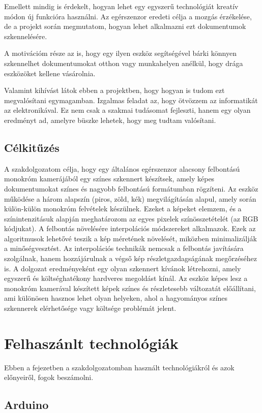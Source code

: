 \documentclass[]{thesis-ekf}
\theoremstyle{definition}
\theoremstyle{remark}
\begin{document}
Emellett mindig is érdekelt, hogyan lehet egy egyszerű technológiát kreatív módon új funkcióra használni. Az egérszenzor eredeti célja a mozgás érzékelése, de a projekt során megmutatom, hogyan lehet alkalmazni ezt dokumentumok szkennelésére.

A motivációm része az is, hogy egy ilyen eszköz segítségével bárki könnyen szkennelhet dokumentumokat otthon vagy munkahelyen anélkül, hogy drága eszközöket kellene vásárolnia. 

Valamint kihívást látok ebben a projektben, hogy hogyan is tudom ezt megvalósítani egymagamban. Izgalmas feladat az, hogy ötvözzem az informatikát az elektronikával. Ez nem csak a szakmai tudásomat fejleszti, hanem egy olyan eredményt ad, amelyre büszke lehetek, hogy meg tudtam valósítani.
\section{Célkitűzés}
A szakdolgozatom célja, hogy egy általános egérszenzor alacsony felbontású monokróm kamerájából egy színes szkennert készítsek, amely képes dokumentumokat színes és nagyobb felbontású formátumban rögzíteni. Az eszköz működése a három alapszín (piros, zöld, kék) megvilágításán alapul, amely során külön-külön monokróm felvételek készülnek. Ezeket a képeket elemzem, és a színintenzitásuk alapján meghatározom az egyes pixelek színösszetételét (az RGB kódjukat). A felbontás növelésére interpolációs módszereket alkalmazok. Ezek az algoritmusok lehetővé teszik a kép méretének növelését, miközben minimalizálják a minőségvesztést. Az interpolációs technikák nemcsak a felbontás javítására szolgálnak, hanem hozzájárulnak a végső kép részletgazdagságának megőrzéséhez is. A dolgozat eredményeként egy olyan szkennert kívánok létrehozni, amely egyszerű és költséghatékony hardveres megoldást kínál. Az eszköz képes lesz a monokróm kamerával készített képek színes és részletesebb változatát előállítani, ami különösen hasznos lehet olyan helyeken, ahol a hagyományos színes szkennerek elérhetősége vagy költsége problémát jelent.
\chapter{Felhaszánlt technológiák}
Ebben a fejezetben a szakdolgozatomban használt technológiákról és azok előnyeiről, fogok beszámolni.
\section{Arduino}
\end{document}
